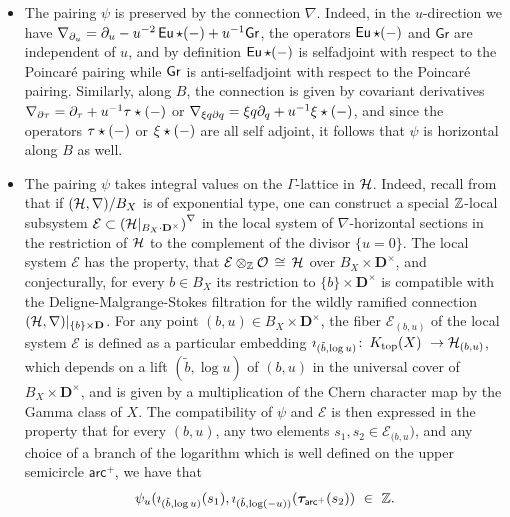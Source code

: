 \documentclass[twoside,leqno]{article}
\numberwithin{equation}{section}
\theoremstyle{plain}
\theoremstyle{definition}
\begin{document}
\begin{itemize}[wide]
\item[(a)] The pairing  $\psi$ is preserved by the connection $\nabla$. Indeed, in the $u$-direction we have $\nabla_{\partial_{u}} = \partial_{u} - u^{-2} \operatorname{\mathsf{Eu}}\star (-) + u^{-1}\mathsf{Gr}$, the operators 
$\operatorname{\mathsf{Eu}}\star (-)$ and $\mathsf{Gr}$ are independent of $u$, and by definition 
$\operatorname{\mathsf{Eu}}\star (-)$ is selfadjoint with respect to the Poincar\'{e} pairing while $\mathsf{Gr}$ is anti-selfadjoint with respect to the Poincar\'{e} pairing. Similarly, along $B$, the connection is given by covariant derivatives 
$\nabla_{\partial{\tau}} = \partial_{\tau} + u^{-1} \tau\star(-)$ or $\nabla_{\xi q\partial{q}} = \xi q\partial_{q} + u^{-1} \xi\star(-)$, and since the operators $\tau\star(-)$ or $\xi\star(-)$ are all self adjoint, it follows that $\psi$ is horizontal along $B$ as well.
\item[(b)]  The pairing $\psi$ takes integral values on the $\Gamma$-lattice in $\mathcal H$. Indeed, recall from \cite[Section~3.1]{Katzarkov_Hodge_theoretic_aspects} that if $(\mathcal H,\nabla)/B_{X}$ is of exponential type, one can construct a special $\mathbb Z$-local subsystem  $\mathcal{E} \subset \left(\mathcal H|_{B_{X}\cdot \mathbf{D}^{\times}}\right)^{\nabla}$ in the local system of $\nabla$-horizontal sections in the restriction of $\mathcal H$ to the complement of the divisor $\{u = 0\}$. The local system $\mathcal{E}$ has the property, that $\mathcal{E}\otimes_{\mathbb Z} \mathcal O \, \cong \, \mathcal H$ over $B_{X}\times \mathbf{D}^{\times}$, and conjecturally, for every $b \in B_{X}$ its restriction to $\{b\}\times \mathbf{D}^{\times}$ is compatible with the Deligne-Malgrange-Stokes filtration for the wildly ramified  connection $(\mathcal H,\nabla)|_{\{b\}\times \mathbf{D}}$. For any point $(b,u) \in B_{X}\times \mathbf{D}^{\times}$, the fiber $\mathcal{E}_{(b,u)}$ of the local system $\mathcal{E}$ is defined as a particular embedding $\imath_{(\tilde{b},\log u)}  \colon \, K_{\operatorname{top}}(X) \ \to \mathcal H_{(b,u)}$, which depends on a lift $(\tilde{b},\log u)$ of $(b,u)$ in the universal cover of $B_{X}\times \mathbf{D}^{\times}$, and is given by a multiplication of the Chern character map by the Gamma class of $X$. The compatibility of $\psi$ and $\mathcal{E}$ is then expressed in the property that 
for every $(b,u)$, any two elements $s_{1}, s_{2} \in \mathcal{E}_{(b,u})$, and any choice of a branch of the logarithm which is well defined on the upper semicircle $\mathsf{arc}^{+}$,  we have 
that 
\[
\psi_{u}(\imath_{(\tilde{b},\log u)}(s_{1}),\imath_{(\tilde{b},\log (-u))}(\boldsymbol{\tau}_{\mathsf{arc}^{+}}(s_{2})) \ \in \ \bbZ.
\]
\end{itemize}
\end{document}
